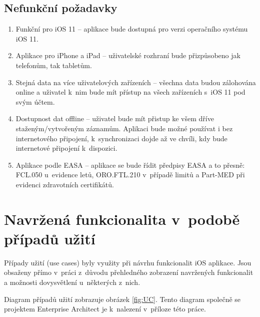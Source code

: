 \documentclass[thesis=M,czech]{FITthesis}[2012/06/26]
\begin{document}
\subsection{Nefunkční požadavky}
\begin{enumerate}
\item Funkční pro iOS 11 -- aplikace bude dostupná pro verzi operačního systému iOS 11.
\item Aplikace pro iPhone a iPad -- uživatelské rozhraní bude přizpůsobeno jak telefonům, tak tabletům.
\item Stejná data na více uživatelových zařízeních -- všechna data budou zálohována online a uživatel k~nim bude mít přístup na všech zařízeních s~iOS 11 pod svým účtem.
\item Dostupnost dat offline -- uživatel bude mít přistup ke všem dříve staženým/vytvořeným záznamům. Aplikaci bude možné používat i bez internetového připojení, k~synchronizaci dojde až ve chvíli, kdy bude internetové připojení k~dispozici.
\item Aplikace podle EASA -- aplikace se bude řídit předpisy EASA a to přesně: FCL.050 u~evidence letů,  ORO.FTL.210 v~případě limitů a Part-MED při evidenci zdravotních certifikátů.
\end{enumerate}

\section{Navržená funkcionalita v~podobě případů užití}
Případy užití (use cases) byly využity při návrhu funkcionalit iOS aplikace. Jsou obsaženy přímo v~práci z~důvodu přehledného zobrazení navržených funkcionalit a možnosti dovysvětlení u~některých z~nich.

Diagram případů užití zobrazuje obrázek \ref{fig:UC}. Tento diagram společně se projektem Enterprise Architect je k~nalezení v~příloze této práce.
\end{document}
